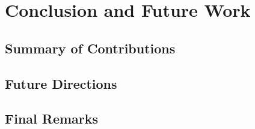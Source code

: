 \chapter{Conclusion and Future Work}
\section{Summary of Contributions}
\section{Future Directions}
\section{Final Remarks}